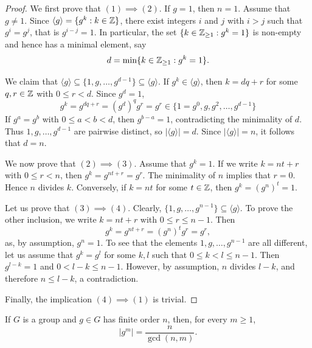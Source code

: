 \begin{proof}
        We first prove that $(1)\implies(2)$.
        If $g=1$, then $n=1$. Assume that $g\ne1$. Since $\langle g\rangle=\{g^k:k\in\mathbb{Z}\}$,
        there exist integers $i$ and $j$ with $i>j$ such that $g^i=g^j$, that is $g^{i-j}=1$. In particular,
        the set $\{k\in\mathbb{Z}_{\geq1}:g^k=1\}$ is non-empty and hence has a minimal element, say 
        \[
        d=\min\{k\in\mathbb{Z}_{\geq1}:g^k=1\}.
        \]
       
         We claim that $\langle g\rangle\subseteq\{1,g,\dots,g^{d-1}\}\subseteq\langle g\rangle$. 
        If $g^k\in\langle g\rangle$, then $k=dq+r$ for some $q,r\in\mathbb{Z}$ with $0\leq r<d$. Since $g^d=1$,
        \[
        g^k=g^{dq+r}=(g^d)^qg^r=g^r\in\{1=g^0,g,g^2,\dots,g^{d-1}\}
        \]
        If $g^a=g^b$ with $0\leq a<b<d$, then
        $g^{b-a}=1$, contradicting the minimality of $d$.
        Thus $1,g,\dots,g^{d-1}$ are pairwise distinct, so
        $|\langle g\rangle|=d$. Since $|\langle g\rangle|=n$, it follows that $d=n$.

        We now prove that $(2)\implies(3)$. Assume that $g^k=1$. If 
        we write $k=nt+r$ with $0\leq r<n$, then $g^k=g^{nt+r}=g^r$. The minimality of $n$ 
        implies that $r=0$. Hence $n$ divides $k$.
        Conversely, if $k=nt$ for some $t\in\mathbb{Z}$, then $g^k=(g^n)^t=1$.

        Let us prove that $(3)\implies(4)$. Clearly, 
        $\{1,g,\dots,g^{n-1}\}\subseteq\langle g\rangle$. To prove the other 
        inclusion, we write $k=nt+r$ with $0\leq r\leq n-1$. Then 
        \[
                g^k=g^{nt+r}=(g^n)^tg^r=g^r, 
        \]
        as, by assumption, $g^n=1$. To see that the elements 
        $1,g,\dots,g^{n-1}$ are all different, let us assume that $g^k=g^l$ for some $k,l$ such that $0\leq
        k<l\leq n-1$. Then $g^{l-k}=1$ and $0<l-k\leq n-1$. However, by assumption, 
        $n$ divides $l-k$, and therefore
        $n\leq l-k$,
        a contradiction.

        Finally, the implication $(4)\implies(1)$ is trivial.
\end{proof}


\begin{corollary}
  If $G$ is a group and $g\in G$ has finite order $n$,
  then, for every $m\geq1$, 
  \[
    |g^m|=\frac{n}{\gcd(n,m)}.
  \]
\end{corollary}

